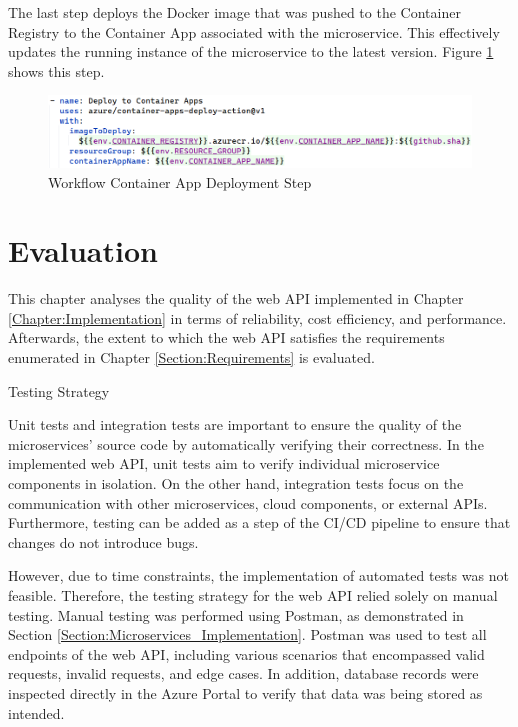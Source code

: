 \documentclass[12pt, reqno]{amsbook}
\makeatletter
\def\section{\@startsection{section}{1}%
      \z@{.5\linespacing\@plus.7\linespacing}{.25\linespacing}%
      {\normalfont\bfseries\flushleft}}
\theoremstyle{definition}
\theoremstyle{definition}
\numberwithin{section}{chapter}
\numberwithin{table}{chapter}
\numberwithin{figure}{chapter}
\makeatother
\begin{document}
The last step deploys the Docker image that was pushed to the Container Registry to the Container App associated with the microservice. This effectively updates the running instance of the microservice to the latest version. Figure \ref{Figure:GithubWorkflowContainerAppDeployment} shows this step.

\begin{figure}[H]
  \centering
  \includegraphics[width=1\linewidth]{images/GithubWorkflowContainerAppDeployment.png}
  \caption{\label{Figure:GithubWorkflowContainerAppDeployment}Workflow Container App Deployment Step}
\end{figure}

\chapter{Evaluation}
\label{Chapter:Evaluation}

This chapter analyses the quality of the web \ac{API} implemented in Chapter \ref{Chapter:Implementation} in terms of reliability, cost efficiency, and performance. Afterwards, the extent to which the web \ac{API} satisfies the requirements enumerated in Chapter \ref{Section:Requirements} is evaluated.

\section{Testing Strategy}
\label{Section:Testing_Strategy}

Unit tests and integration tests are important to ensure the quality of the microservices' source code by automatically verifying their correctness. In the implemented web \ac{API}, unit tests aim to verify individual microservice components in isolation. On the other hand, integration tests focus on the communication with other microservices, cloud components, or external \acp{API}. Furthermore, testing can be added as a step of the CI/CD pipeline to ensure that changes do not introduce bugs.

However, due to time constraints, the implementation of automated tests was not feasible. Therefore, the testing strategy for the web \ac{API} relied solely on manual testing. Manual testing was performed using Postman, as demonstrated in Section \ref{Section:Microservices_Implementation}. Postman was used to test all endpoints of the web \ac{API}, including various scenarios that encompassed valid requests, invalid requests, and edge cases. In addition, database records were inspected directly in the Azure Portal to verify that data was being stored as intended.
\end{document}
